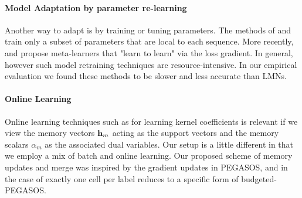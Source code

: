 \documentclass[letterpaper]{article} %
\newcommand{\vek}[1]{{\bf {#1}}}
\newcommand{\vh}{{\vek{h}}}
\begin{document}

%
\paragraph{Model Adaptation by parameter re-learning}
Another way to adapt is by training or tuning parameters. The methods of \cite{Rei15} and \cite{Huang2015MaximumAP} train only a subset of parameters that are local to each sequence.  More recently,\cite{Finn2017ModelAgnosticMF} and \cite{ravi17} propose meta-learners that "learn to learn" via
the loss gradient. In general, however such model retraining techniques are resource-intensive. In our empirical evaluation we found these methods to be slower and less accurate than LMNs.

\paragraph{Online Learning} Online learning techniques such as \cite{shalevshwartz:icml07} for learning kernel coefficients is relevant if we view the memory vectors $ \vh_m$ acting as the support vectors and the memory scalars $\alpha_m$ as the associated dual variables.  Our setup is a little different in that we employ a mix of batch and online learning. Our proposed scheme of memory updates and merge was inspired by the gradient updates in PEGASOS, and in the case of exactly one cell per label reduces to a specific form of budgeted-PEGASOS\cite{WangCV10}.
\end{document}
